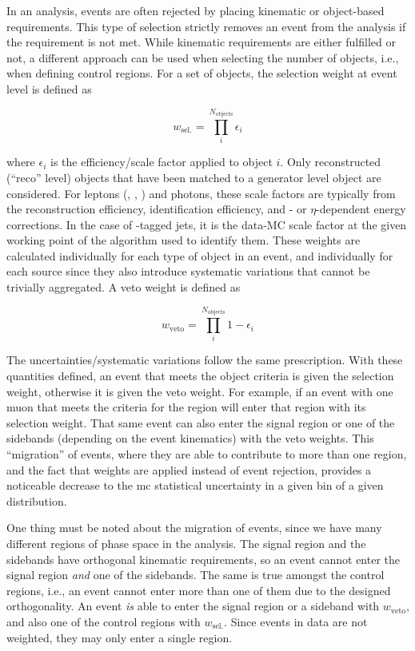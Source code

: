 In an analysis, events are often rejected by placing kinematic or object-based requirements. This type of selection strictly removes an event from the analysis if the requirement is not met. While kinematic requirements are either fulfilled or not, a different approach can be used when selecting the number of objects, i.e., when defining control regions. For a set of objects, the selection weight at event level is defined as

\begin{equation}
    w_{\mathrm{sel.}} = \prod_i^{N_\mathrm{objects}} \epsilon_i
    \label{eq:event_selection_weight}
\end{equation}

where $\epsilon_i$ is the efficiency/scale factor applied to object $i$. Only reconstructed (``reco'' level) objects that have been matched to a generator level object are considered. For leptons (\Pe, \Pmu, \Ptau) and photons, these scale factors are typically from the reconstruction efficiency, identification efficiency, and \pt- or $\eta$-dependent energy corrections. In the case of \Pqb-tagged jets, it is the data-MC scale factor at the given working point of the algorithm used to identify them. These weights are calculated individually for each type of object in an event, and individually for each source since they also introduce systematic variations that cannot be trivially aggregated. A veto weight is defined as

\begin{equation}
    w_{\mathrm{veto}} = \prod_i^{N_\mathrm{objects}} 1 - \epsilon_i
    \label{eq:event_veto_weight}
\end{equation}

The uncertainties/systematic variations follow the same prescription. With these quantities defined, an event that meets the object criteria is given the selection weight, otherwise it is given the veto weight. For example, if an event with one muon that meets the criteria for the \singleMuCr region will enter that region with its selection weight. That same event can also enter the signal region or one of the sidebands (depending on the event kinematics) with the veto weights. This ``migration'' of events, where they are able to contribute to more than one region, and the fact that weights are applied instead of event rejection, provides a noticeable decrease to the \acrlong{mc} statistical uncertainty in a given bin of a given distribution.

One thing must be noted about the migration of events, since we have many different regions of phase space in the analysis. The signal region and the sidebands have orthogonal kinematic requirements, so an event cannot enter the signal region \emph{and} one of the sidebands. The same is true amongst the control regions, i.e., an event cannot enter more than one of them due to the designed orthogonality. An event \emph{is} able to enter the signal region or a sideband with $w_{\mathrm{veto}}$, and also one of the control regions with $w_{\mathrm{sel.}}$. Since events in data are not weighted, they may only enter a single region.


